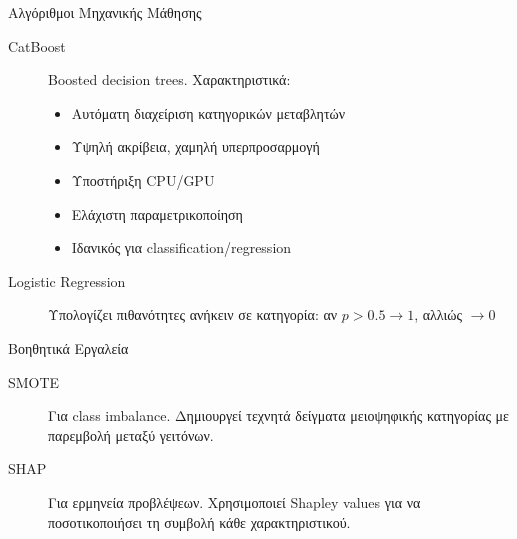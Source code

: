\documentclass{beamer}
\newcommand{\tl}[1]{\textlatin{#1}}
\begin{document}
\begin{frame}{Αλγόριθμοι Μηχανικής Μάθησης}
\begin{description}
 \item[\tl{CatBoost}] \textlatin{Boosted decision trees}. Χαρακτηριστικά:
 \begin{itemize}
  \item Αυτόματη διαχείριση κατηγορικών μεταβλητών
  \item Υψηλή ακρίβεια, χαμηλή υπερπροσαρμογή
  \item Υποστήριξη \textlatin{CPU/GPU}
  \item Ελάχιστη παραμετρικοποίηση
  \item Ιδανικός για \textlatin{classification/regression}
 \end{itemize}
 \item[\tl{Logistic Regression}] Υπολογίζει πιθανότητες ανήκειν σε κατηγορία: αν \(p > 0.5 \rightarrow 1\), αλλιώς \( \rightarrow 0 \)
\end{description}
\end{frame}

\begin{frame}{Βοηθητικά Εργαλεία}
\begin{description}
 \item[\tl{SMOTE}] Για \textlatin{class imbalance}. Δημιουργεί τεχνητά δείγματα μειοψηφικής κατηγορίας με παρεμβολή μεταξύ γειτόνων.
 \item[\tl{SHAP}] Για ερμηνεία προβλέψεων. Χρησιμοποιεί \textlatin{Shapley values} για να ποσοτικοποιήσει τη συμβολή κάθε χαρακτηριστικού.
\end{description}
\end{frame}
\end{document}
